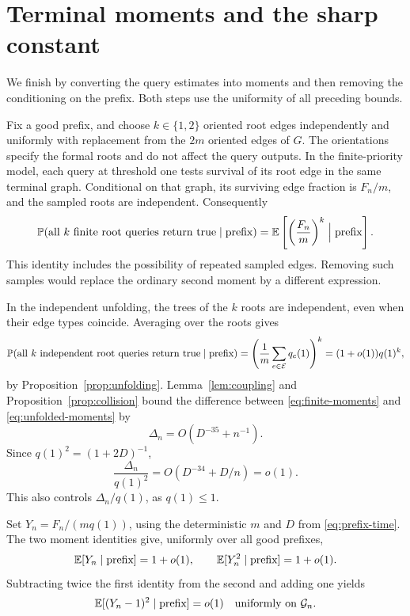 \section{Terminal moments and the sharp constant}
\label{sec:moments}

We finish by converting the query estimates into moments and then
removing the conditioning on the prefix. Both steps use the uniformity
of all preceding bounds.

Fix a good prefix, and choose $k\in\{1,2\}$ oriented root edges
independently and uniformly with replacement from the $2m$ oriented
edges of $G$. The orientations specify the formal roots and do not
affect the query outputs. In the finite-priority model, each query at
threshold one tests survival of its root edge in the same terminal
graph. Conditional on that graph, its surviving edge fraction is
$F_n/m$, and the sampled roots are independent. Consequently
\begin{equation}\label{eq:finite-moments}
 \mathbb P(\text{all $k$ finite root queries return true}\mid\text{prefix})
       =\mathbb E\left[\left(\frac{F_n}{m}\right)^k
                        \mathrel{\Big|}\text{prefix}\right].
\end{equation}
This identity includes the possibility of repeated sampled edges.
Removing such samples would replace the ordinary second moment by a
different expression.

In the independent unfolding, the trees of the $k$ roots are independent,
even when their edge types coincide. Averaging over the roots gives
\begin{equation}\label{eq:unfolded-moments}
 \mathbb P(\text{all $k$ independent root queries return true}\mid\text{prefix})
       =\left(\frac1m\sum_{e\in\mathcal E}q_e(1)\right)^k
       =(1+o(1))q(1)^k,
\end{equation}
by Proposition~\ref{prop:unfolding}. Lemma~\ref{lem:coupling} and
Proposition~\ref{prop:collision} bound the difference between
\eqref{eq:finite-moments} and \eqref{eq:unfolded-moments} by
\[
 \Delta_n=O(D^{-35}+n^{-1}).
\]
Since $q(1)^2=(1+2D)^{-1}$,
\begin{equation}\label{eq:relative-error}
 \frac{\Delta_n}{q(1)^2}
    =O(D^{-34}+D/n)=o(1).
\end{equation}
This also controls $\Delta_n/q(1)$, as $q(1)\le1$.

Set $Y_n=F_n/(mq(1))$, using the deterministic $m$ and $D$ from
\eqref{eq:prefix-time}. The two moment identities give, uniformly over
all good prefixes,
\[
 \mathbb E[Y_n\mid\text{prefix}]=1+o(1),\qquad
 \mathbb E[Y_n^2\mid\text{prefix}]=1+o(1).
\]
Subtracting twice the first identity from the second and adding one
yields
\begin{equation}\label{eq:conditional-l2}
 \mathbb E[(Y_n-1)^2\mid\text{prefix}]=o(1)
 \quad\text{uniformly on }\mathcal G_n.
\end{equation}


